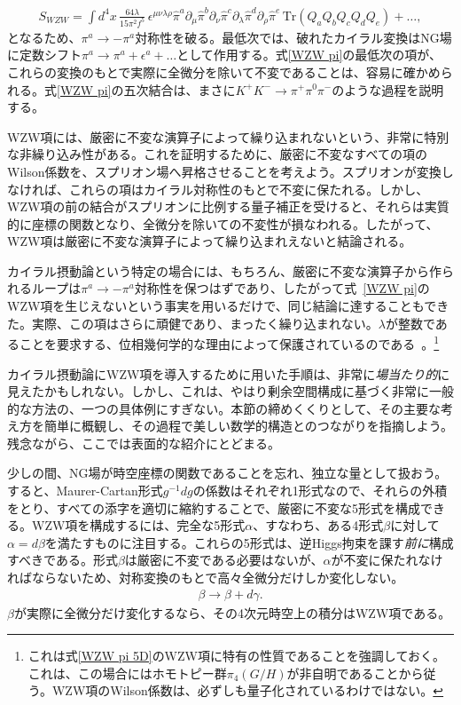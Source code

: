 %
\begin{align} \label{WZW pi}
	S_{WZW} = \int d^4 x \, \frac{64 \lambda}{15 \pi^2 f^5} \, \epsilon^{\mu\nu\lambda\rho} \hat \pi^a \partial_\mu \hat  \pi^b \partial_\nu \hat  \pi^c \partial_\lambda \hat  \pi^d \partial_\rho \hat  \pi^e \, \mbox{Tr} (Q_a Q_b Q_c Q_d Q_e) + \dots ,
\end{align}
%
となるため、$\pi^a \to - \pi^a$対称性を破る。最低次では、破れたカイラル変換はNG場に定数シフト$\pi^a \to \pi^a + \epsilon^a + \dots$として作用する。式\eqref{WZW pi}の最低次の項が、これらの変換のもとで実際に全微分を除いて不変であることは、容易に確かめられる。式\eqref{WZW pi}の五次結合は、まさに$K^+ K^- \to \pi^+ \pi^0 \pi^-$のような過程を説明する。

WZW項には、厳密に不変な演算子によって繰り込まれないという、非常に特別な非繰り込み性がある。これを証明するために、厳密に不変なすべての項のWilson係数を、スプリオン場へ昇格させることを考えよう。スプリオンが変換しなければ、これらの項はカイラル対称性のもとで不変に保たれる。しかし、WZW項の前の結合がスプリオンに比例する量子補正を受けると、それらは実質的に座標の関数となり、全微分を除いての不変性が損なわれる。したがって、WZW項は厳密に不変な演算子によって繰り込まれえないと結論される。

カイラル摂動論という特定の場合には、もちろん、厳密に不変な演算子から作られるループは$\pi^a \to - \pi^a$対称性を保つはずであり、したがって式~\eqref{WZW pi}のWZW項を生じえないという事実を用いるだけで、同じ結論に達することもできた。実際、この項はさらに頑健であり、まったく繰り込まれない。$\lambda$が整数であることを要求する、位相幾何学的な理由によって保護されているのである~\cite{Witten:1983tw}。\footnote{これは式\eqref{WZW pi 5D}のWZW項に特有の性質であることを強調しておく。これは、この場合にはホモトピー群$\pi_4 (G/H)$が非自明であることから従う。WZW項のWilson係数は、必ずしも量子化されているわけではない。}

 

カイラル摂動論にWZW項を導入するために用いた手順は、非常に\emph{場当たり的}に見えたかもしれない。しかし、これは、やはり剰余空間構成に基づく非常に一般的な方法の、一つの具体例にすぎない。本節の締めくくりとして、その主要な考え方を簡単に概観し、その過程で美しい数学的構造とのつながりを指摘しよう。残念ながら、ここでは表面的な紹介にとどまる。

少しの間、NG場が時空座標の関数であることを忘れ、独立な量として扱おう。すると、Maurer-Cartan形式$g^{-1} d g$の係数はそれぞれ1形式なので、それらの外積をとり、すべての添字を適切に縮約することで、厳密に不変な5形式を構成できる。WZW項を構成するには、完全な5形式$\alpha$、すなわち、ある4形式$\beta$に対して$\alpha = d \beta$を満たすものに注目する。これらの5形式は、逆Higgs拘束を課す\emph{前に}構成すべきである。形式$\beta$は厳密に不変である必要はないが、$\alpha$が不変に保たれなければならないため、対称変換のもとで高々全微分だけしか変化しない。
%
\begin{align}
	\beta \to \beta + d \gamma . 
\end{align}
%
$\beta$が実際に全微分だけ変化するなら、その4次元時空上の積分はWZW項である。

